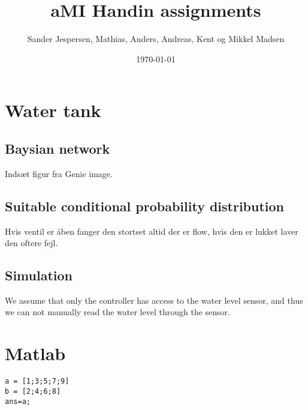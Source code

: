 \documentclass[colorlinks=true,linkcolor=blue]{article}
\author{Sander Jespersen, Mathias, Anders, Andreas, Kent og Mikkel Madsen}
\date{\today}
\title{aMI Handin assignments}
\begin{document}
\maketitle

\section{Water tank}
\label{sec-1}
\subsection{Baysian network}
\label{sec-1-1}
Indsæt figur fra Genie image.

\subsection{Suitable conditional probability distribution}
\label{sec-1-2}
Hvis ventil er åben fanger den stortset altid der er flow, hvis den er lukket laver den oftere fejl.


\subsection{Simulation}
\label{sec-1-3}
We assume that only the controller has access to the water level sensor, and thus we can not manually read the water level through the sensor.

\section{Matlab}
\label{sec-2}

\begin{verbatim}
a = [1;3;5;7;9]
b = [2;4;6;8]
ans=a;
\end{verbatim}
\end{document}
